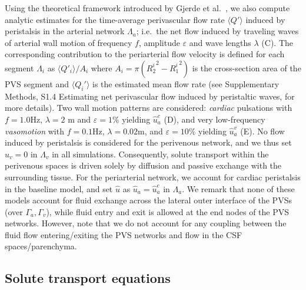 \documentclass[fleqn,10pt]{wlscirep}
\begin{document}
Using the theoretical framework introduced by Gjerde et
al.~\cite{gjerde2023directional}, we also compute analytic estimates
for the time-average perivascular flow rate $\langle Q' \rangle$
induced by peristalsis in the arterial network $\Lambda_a$; i.e.~the
net flow induced by traveling waves of arterial wall motion of
frequency $f$, amplitude $\varepsilon$ and wave lengths $\lambda$
(C). The corresponding contribution to the periarterial
flow velocity is defined for each segment $\Lambda_i$ as $\langle Q'_i
\rangle/A_i$ where $A_i = \pi ({R_2^i}^2 - {R_1^i}^2)$ is the
cross-section area of the PVS segment and $\langle Q_i' \rangle$ is
the estimated mean flow rate (see Supplementary Methods, S1.4
Estimating net perivascular flow induced by peristaltic waves, for
more details). Two wall motion patterns are considered: \emph{cardiac}
pulsations with $f = 1.0$Hz, $\lambda = 2$ m and $\varepsilon = 1\%$
yielding $\hat{u}_a^c$ (D), and very low-frequency
\emph{vasomotion} with $f = 0.1$Hz, $\lambda = 0.02$m, and
$\varepsilon = 10\%$ yielding $\hat{u}_a^v$ (E). No flow
induced by peristalsis is considered for the perivenous network, and
we thus set $\hat{u}_v = 0$ in $\Lambda_v$ in all simulations. Consequently, 
solute transport within the perivenous spaces is driven solely by diffusion 
and passive exchange with the surrounding tissue. For
the periarterial network, we account for cardiac peristalsis in the
baseline model, and set $\hat{u}$ as $\hat{u}_a = \hat{u}_a^c$ in
$\Lambda_a$.  We remark that none of these models account for fluid
exchange across the lateral outer interface of the PVSs (over
$\Gamma_a, \Gamma_v$), while fluid entry and exit is allowed at the
end nodes of the PVS networks. However, note that we do not account
for any coupling between the fluid flow entering/exiting the PVS
networks and flow in the CSF spaces/parenchyma.

\subsection*{Solute transport equations}
\end{document}
